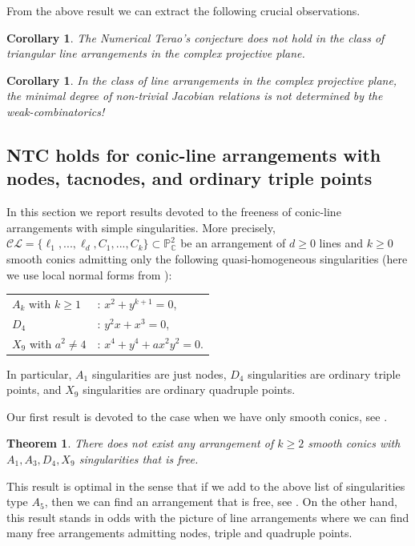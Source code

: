 \documentclass[12pt]{article}
\theoremstyle{plain}
\newtheorem{theorem}[thm]{Theorem}
\newtheorem{corollary}[thm]{Corollary}
\theoremstyle{definition}
\renewcommand\geq{\geqslant}
\begin{document}
From the above result we can extract the following crucial observations.
\begin{corollary}
The Numerical Terao's conjecture does not hold in the class of triangular line arrangements in the complex projective plane.
\end{corollary}
\begin{corollary}
In the class of line arrangements in the complex projective plane, the minimal degree of non-trivial Jacobian relations is not determined by the weak-combinatorics!
\end{corollary}
\subsection{\textbf{NTC} holds for conic-line arrangements with nodes, tacnodes, and ordinary triple points}
In this section we report results devoted to the freeness of conic-line arrangements with simple singularities. More precisely, $\mathcal{CL} = \{\ell_{1}, ...,\ell_{d}, C_{1}, ..., C_{k}\} \subset \mathbb{P}^{2}_{\mathbb{C}}$ be an arrangement of $d\geq 0$ lines and $k\geq 0$ smooth conics admitting only the following quasi-homogeneous singularities (here we use local normal forms from \cite{arnold}):
\begin{center}
\begin{tabular}{ll}
$A_{k}$ with $k\geq 1$ & $: \, x^{2}+y^{k+1}  = 0$, \\
$D_{4}$ & $: \, y^{2}x + x^{3}  = 0$,\\
$X_{9}$ with $a^{2}\neq 4$ & $: \, x^{4} + y^{4} +ax^{2}y^{2}= 0$. 
\end{tabular}
\end{center}
In particular, $A_{1}$ singularities are just nodes, $D_{4}$ singularities are ordinary triple points, and $X_{9}$ singularities are ordinary quadruple points.

Our first result is devoted to the case when we have only smooth conics, see \cite[Theorem A]{Pokora}.
\begin{theorem}
There does not exist any arrangement of $k\geq 2$ smooth conics with $A_{1}, A_{3}, D_{4}, X_{9}$ singularities that is free.
\end{theorem}
This result is optimal in the sense that if we add to the above list of singularities type $A_{5}$, then we can find an arrangement that is free, see \cite[Remark 2.5]{P}. On the other hand, this result stands in odds with the picture of line arrangements where we can find many free arrangements admitting nodes, triple and quadruple points.
\end{document}
